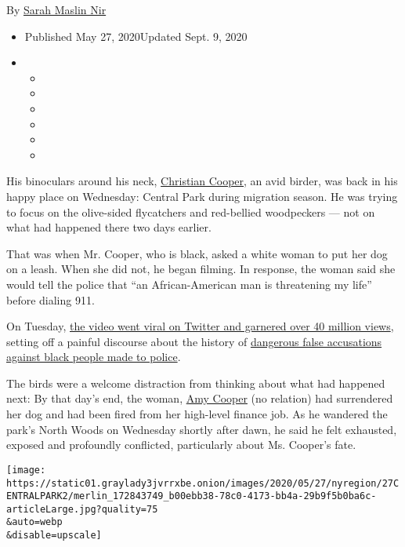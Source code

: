 By \href{https://www.nytimes3xbfgragh.onion/by/sarah-maslin-nir}{Sarah
Maslin Nir}

\begin{itemize}
\item
  Published May 27, 2020Updated Sept. 9, 2020
\item
  \begin{itemize}
  \item
  \item
  \item
  \item
  \item
  \item
  \end{itemize}
\end{itemize}

His binoculars around his neck,
\href{https://www.nytimes3xbfgragh.onion/2020/09/09/nyregion/christian-cooper-amy-comic-graphic-novel.html}{Christian
Cooper}, an avid birder, was back in his happy place on Wednesday:
Central Park during migration season. He was trying to focus on the
olive-sided flycatchers and red-bellied woodpeckers --- not on what had
happened there two days earlier.

That was when Mr. Cooper, who is black, asked a white woman to put her
dog on a leash. When she did not, he began filming. In response, the
woman said she would tell the police that ``an African-American man is
threatening my life'' before dialing 911.

On Tuesday,
\href{https://www.nytimes3xbfgragh.onion/2020/05/26/nyregion/amy-cooper-dog-central-park.html}{the
video went viral on Twitter and garnered over 40 million views}, setting
off a painful discourse about the history of
\href{https://www.nytimes3xbfgragh.onion/2020/05/30/nyregion/central-park-video.html}{dangerous
false accusations against black people made to police}.

The birds were a welcome distraction from thinking about what had
happened next: By that day's end, the woman,
\href{https://www.nytimes3xbfgragh.onion/2020/09/09/nyregion/christian-cooper-amy-comic-graphic-novel.html}{Amy
Cooper} (no relation) had surrendered her dog and had been fired from
her high-level finance job. As he wandered the park's North Woods on
Wednesday shortly after dawn, he said he felt exhausted, exposed and
profoundly conflicted, particularly about Ms. Cooper's fate.

\texttt{[image: https://static01.graylady3jvrrxbe.onion/images/2020/05/27/nyregion/27CENTRALPARK2/merlin\_172843749\_b00ebb38-78c0-4173-bb4a-29b9f5b0ba6c-articleLarge.jpg?quality=75\\\&auto=webp\\\&disable=upscale]}

